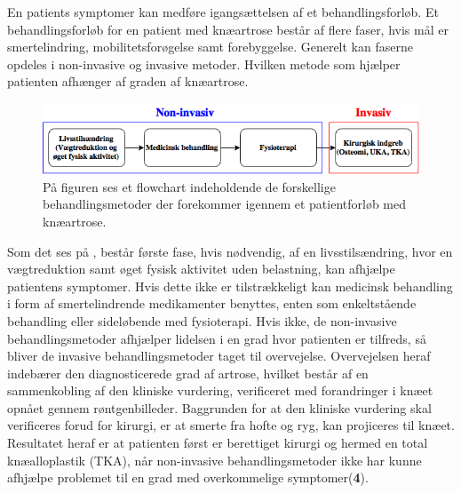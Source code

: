 En patients symptomer kan medføre igangsættelsen af et behandlingsforløb. Et behandlingsforløb for en patient med knæartrose består af flere faser, hvis mål er smertelindring, mobilitetsforøgelse samt forebyggelse. Generelt kan faserne opdeles i non-invasive og invasive metoder. Hvilken metode som hjælper patienten afhænger af graden af knæartrose.

\begin{figure}[H]
	\centering
	\includegraphics[width=1\textwidth]{figures/bProblemanalyse/flowchart_behandlingsforloeb.png}
	\caption{På figuren ses et flowchart indeholdende de forskellige behandlingsmetoder der forekommer igennem et patientforløb med knæartrose.}
	\label{fig:flow_behandlingsfaser}
\end{figure}\vspace{-.25cm}

Som det ses på , består første fase, hvis nødvendig, af en livsstilsændring, hvor en vægtreduktion samt øget fysisk aktivitet uden belastning, kan afhjælpe patientens symptomer. Hvis dette ikke er tilstrækkeligt kan medicinsk behandling i form af smertelindrende medikamenter benyttes, enten som enkeltstående behandling eller sideløbende med fysioterapi. Hvis ikke, de non-invasive behandlingsmetoder afhjælper lidelsen i en grad hvor patienten er tilfreds, så bliver de invasive behandlingsmetoder taget til overvejelse. Overvejelsen heraf indebærer den diagnosticerede grad af artrose, hvilket består af en sammenkobling af den kliniske vurdering, verificeret med forandringer i knæet opnået gennem røntgenbilleder. Baggrunden for at den kliniske vurdering skal verificeres forud for kirurgi, er at smerte fra hofte og ryg, kan projiceres til knæet. Resultatet heraf er at patienten først er berettiget kirurgi og hermed en total knæalloplastik (TKA), når non-invasive behandlingsmetoder ikke har kunne afhjælpe problemet til en grad med overkommelige symptomer(\textbf{4}). \citep{Lind2016b} \citep{brostrom2012} \citep{skou2016}




